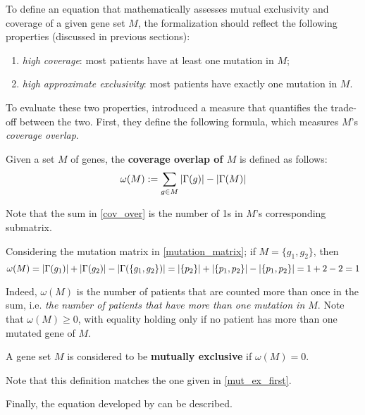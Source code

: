 To define an equation that mathematically assesses mutual exclusivity and coverage of a given gene set $M$, the formalization should reflect the following properties (discussed in previous sections):

\begin{enumerate}[label=\roman*), font=\itshape]
    \item \textit{high coverage}: most patients have at least one mutation in $M$;
    \item \textit{high approximate exclusivity}: most patients have exactly one mutation in $M$.
\end{enumerate}

To evaluate these two properties, \textcite{dendrix} introduced a measure that quantifies the trade-off between the two. First, they define the following formula, which measures $M$'s \textit{coverage overlap}.

\begin{definition} \label{cov_over}
    Given a set $M$ of genes, the \textbf{coverage overlap of $M$} is defined as follows: $$\omega(M) := \sum_{g \in M}{\left|\Gamma(g)\right|} - \left|\Gamma(M)\right|$$
\end{definition}

Note that the sum in \cref{cov_over} is the number of 1s in $M$'s corresponding submatrix.

\begin{example}
    Considering the mutation matrix in \cref{mutation_matrix}; if $M=\{g_1, g_2\}$, then $$\omega(M)=\left|\Gamma(g_1)\right| + \left|\Gamma(g_2)\right| - \left|\Gamma(\{g_1, g_2\})\right| = \left|\{p_2\}\right| + \left|\{p_1, p_2\}\right| - \left|\{p_1, p_2\}\right| = 1 + 2 - 2 = 1$$
\end{example}

Indeed, $\omega(M)$ is the number of patients that are counted more than once in the sum, i.e. \textit{the number of patients that have more than one mutation in $M$}. Note that $\omega(M) \ge 0$, with equality holding only if no patient has more than one mutated gene of $M$.

\begin{definition}
    A gene set $M$ is considered to be \textbf{mutually exclusive} if $\omega(M) = 0$.
\end{definition}

Note that this definition matches the one given in \cref{mut_ex_first}.

Finally, the equation developed by \textcite{dendrix} can be described.

